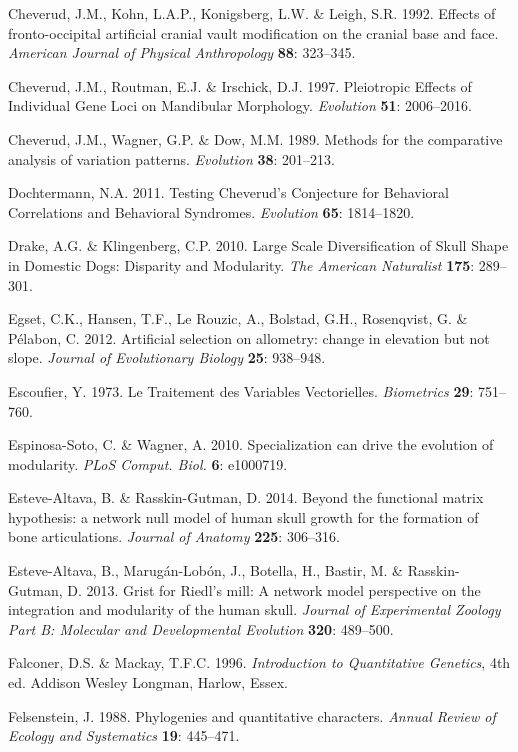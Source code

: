 \documentclass[12pt,twoside]{report}
\begin{document}
Cheverud, J.M., Kohn, L.A.P., Konigsberg, L.W. \& Leigh, S.R. 1992.
Effects of fronto-occipital artificial cranial vault modification on the
cranial base and face. \emph{American Journal of Physical Anthropology}
\textbf{88}: 323--345.

Cheverud, J.M., Routman, E.J. \& Irschick, D.J. 1997. Pleiotropic
Effects of Individual Gene Loci on Mandibular Morphology.
\emph{Evolution} \textbf{51}: 2006--2016.

Cheverud, J.M., Wagner, G.P. \& Dow, M.M. 1989. Methods for the
comparative analysis of variation patterns. \emph{Evolution}
\textbf{38}: 201--213.

Dochtermann, N.A. 2011. Testing Cheverud's Conjecture for Behavioral
Correlations and Behavioral Syndromes. \emph{Evolution} \textbf{65}:
1814--1820.

Drake, A.G. \& Klingenberg, C.P. 2010. Large Scale Diversification of
Skull Shape in Domestic Dogs: Disparity and Modularity. \emph{The
American Naturalist} \textbf{175}: 289--301.

Egset, C.K., Hansen, T.F., Le Rouzic, A., Bolstad, G.H., Rosenqvist, G.
\& Pélabon, C. 2012. Artificial selection on allometry: change in
elevation but not slope. \emph{Journal of Evolutionary Biology}
\textbf{25}: 938--948.

Escoufier, Y. 1973. Le Traitement des Variables Vectorielles.
\emph{Biometrics} \textbf{29}: 751--760.

Espinosa-Soto, C. \& Wagner, A. 2010. Specialization can drive the
evolution of modularity. \emph{PLoS Comput. Biol.} \textbf{6}: e1000719.

Esteve-Altava, B. \& Rasskin-Gutman, D. 2014. Beyond the functional
matrix hypothesis: a network null model of human skull growth for the
formation of bone articulations. \emph{Journal of Anatomy} \textbf{225}:
306--316.

Esteve-Altava, B., Marugán-Lobón, J., Botella, H., Bastir, M. \&
Rasskin-Gutman, D. 2013. Grist for Riedl's mill: A network model
perspective on the integration and modularity of the human skull.
\emph{Journal of Experimental Zoology Part B: Molecular and
Developmental Evolution} \textbf{320}: 489--500.

Falconer, D.S. \& Mackay, T.F.C. 1996. \emph{Introduction to
Quantitative Genetics}, 4th ed. Addison Wesley Longman, Harlow, Essex.

Felsenstein, J. 1988. Phylogenies and quantitative characters.
\emph{Annual Review of Ecology and Systematics} \textbf{19}: 445--471.
\end{document}
